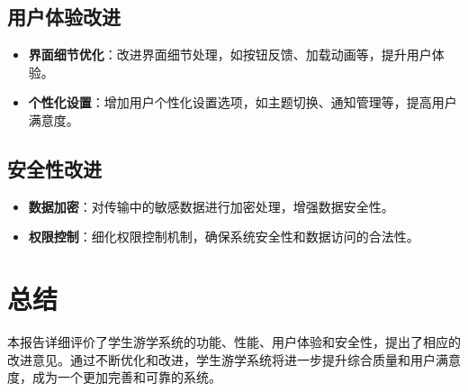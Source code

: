 \documentclass{ctexart}
\begin{document}
\subsection{用户体验改进}
\begin{itemize}
    \item \textbf{界面细节优化}：改进界面细节处理，如按钮反馈、加载动画等，提升用户体验。
    \item \textbf{个性化设置}：增加用户个性化设置选项，如主题切换、通知管理等，提高用户满意度。
\end{itemize}

\subsection{安全性改进}
\begin{itemize}
    \item \textbf{数据加密}：对传输中的敏感数据进行加密处理，增强数据安全性。
    \item \textbf{权限控制}：细化权限控制机制，确保系统安全性和数据访问的合法性。
\end{itemize}

\section{总结}
本报告详细评价了学生游学系统的功能、性能、用户体验和安全性，提出了相应的改进意见。通过不断优化和改进，学生游学系统将进一步提升综合质量和用户满意度，成为一个更加完善和可靠的系统。
\end{document}
